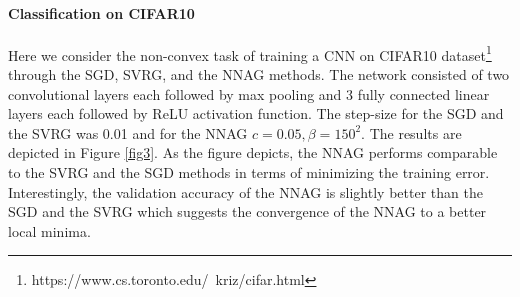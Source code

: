 \documentclass{article}
\theoremstyle{plain}
\theoremstyle{definition}
\theoremstyle{remark}
\begin{document}
\paragraph{Classification on CIFAR10}
Here we consider the non-convex task of training a CNN on CIFAR10 dataset\footnote{https://www.cs.toronto.edu/~kriz/cifar.html} through the SGD, SVRG, and the NNAG methods. The network consisted of two convolutional layers each followed by max pooling and 3 fully connected linear layers each followed by ReLU activation function. The step-size for the SGD and the SVRG was 0.01 and for the NNAG \(c=0.05,\beta = 150^2\). The results are depicted in Figure \ref{fig3}. As the figure depicts, the NNAG performs comparable to the SVRG and the SGD methods in terms of minimizing the training error. Interestingly, the validation accuracy of the NNAG is slightly better than the SGD and the SVRG which suggests the convergence of the NNAG to a better local minima. 
\end{document}
